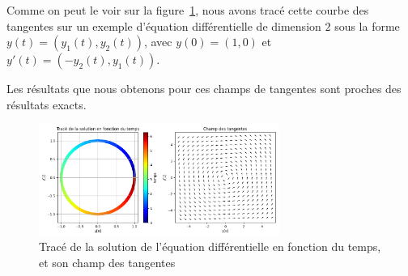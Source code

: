 Comme on peut le voir sur la figure~\ref{fig:tangente}, nous avons tracé cette courbe des tangentes sur un exemple d'équation différentielle
de dimension $2$ sous la forme $y(t)=(y_1(t),y_2(t))$, avec $y(0)=(1,0)$ et $y'(t)=(-y_2(t),y_1(t))$.

Les résultats que nous obtenons pour ces champs de tangentes sont proches des résultats exacts.

\begin{figure}[htbp!]
	\centering
	\includegraphics[width=0.7\textwidth]{res/tangente}
	\caption{Tracé de la solution de l'équation différentielle en fonction du temps, et son champ des tangentes}
	\label{fig:tangente}
\end{figure}
